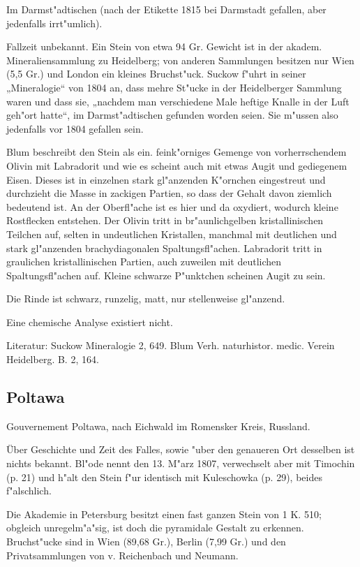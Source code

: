 \documentclass[a4paper, 11pt, oneside]{article}
\begin{document}
Im Darmst"adtischen (nach der Etikette 1815 bei Darmstadt gefallen, aber jedenfalls irrt"umlich).

Fallzeit unbekannt. Ein Stein von etwa 94 Gr. Gewicht ist in der akadem. Mineraliensammlung zu Heidelberg; von anderen Sammlungen besitzen nur Wien (5,5 Gr.) und London ein kleines Bruchst"uck. Suckow f"uhrt in seiner „Mineralogie“ von 1804 an, dass mehre St"ucke in der Heidelberger Sammlung waren und dass sie, „nachdem man verschiedene Male heftige Knalle in der Luft geh"ort hatte“, im Darmst"adtischen gefunden worden seien. Sie m"ussen also jedenfalls vor 1804 gefallen sein.

Blum beschreibt den Stein als ein. feink"orniges Gemenge von vorherrschendem Olivin mit Labradorit und wie es scheint auch mit etwas Augit und gediegenem Eisen. Dieses ist in einzelnen stark gl"anzenden K"ornchen eingestreut und durchzieht die Masse in zackigen Partien, so dass der Gehalt davon ziemlich bedeutend ist. An der Oberfl"ache ist es hier und da oxydiert, wodurch kleine Rostflecken entstehen. Der Olivin tritt in br"aunlichgelben kristallinischen Teilchen auf, selten in undeutlichen Kristallen, manchmal mit deutlichen und stark gl"anzenden brachydiagonalen Spaltungsfl"achen. Labradorit tritt in graulichen kristallinischen Partien, auch zuweilen mit deutlichen Spaltungsfl"achen auf. Kleine schwarze P"unktchen scheinen Augit zu sein.

Die Rinde ist schwarz, runzelig, matt, nur stellenweise gl"anzend.

Eine chemische Analyse existiert nicht.

Literatur: Suckow Mineralogie 2, 649. Blum Verh. naturhistor. medic. Verein Heidelberg. B. 2, 164.

\subsection{Poltawa}

Gouvernement Poltawa, nach Eichwald im Romensker Kreis, Russland.

Über Geschichte und Zeit des Falles, sowie "uber den genaueren Ort desselben ist nichts bekannt. Bl"ode nennt den 13. M"arz 1807, verwechselt aber mit Timochin (p. 21) und h"alt den Stein f"ur identisch mit Kuleschowka (p. 29), beides f"alschlich.

Die Akademie in Petersburg besitzt einen fast ganzen Stein von 1 K. 510; obgleich unregelm"a"sig, ist doch die pyramidale Gestalt zu erkennen. Bruchst"ucke sind in Wien (89,68 Gr.), Berlin (7,99 Gr.) und den Privatsammlungen von v. Reichenbach und Neumann.
\end{document}
